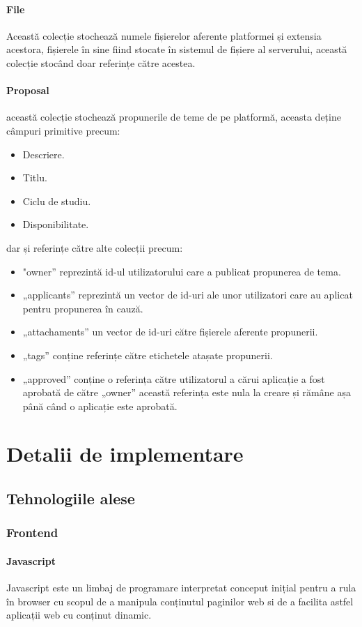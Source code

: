 \documentclass[12pt,a4paper,hidelinks]{report}
\theoremstyle{definition}
\theoremstyle{remark}
\begin{document}
\subsubsection{File}
Această colecție stochează numele fișierelor aferente platformei și extensia acestora, fișierele în sine fiind stocate în sistemul de fișiere al serverului, această colecție stocând doar referințe către acestea.
\subsubsection{Proposal}
această colecție stochează propunerile de teme de pe platformă, aceasta deține câmpuri primitive precum:
\begin{itemize}
    \item Descriere.
    \item Titlu.
    \item Ciclu de studiu.
    \item Disponibilitate.
\end{itemize}
dar și referințe către alte colecții precum:
\begin{itemize}
    \item "owner” reprezintă id-ul utilizatorului care a publicat propunerea de tema.
    \item „applicants” reprezintă un vector de id-uri ale unor utilizatori care au aplicat pentru propunerea în cauză.
    \item „attachaments” un vector de id-uri către fișierele aferente propunerii.
    \item „tags” conține referințe către etichetele atașate propunerii.
    \item „approved” conține o referința către utilizatorul a cărui aplicație a fost aprobată de către „owner” această referința este nula la creare și rămâne așa până când o aplicație este aprobată.
\end{itemize}
\chapter{Detalii de implementare}
\section{Tehnologiile alese}
\subsection{Frontend}
\subsubsection{Javascript}
Javascript este un limbaj de programare interpretat conceput inițial pentru a rula în browser cu scopul de a
manipula conținutul paginilor web si de a facilita astfel aplicații web cu conținut dinamic.
\end{document}
